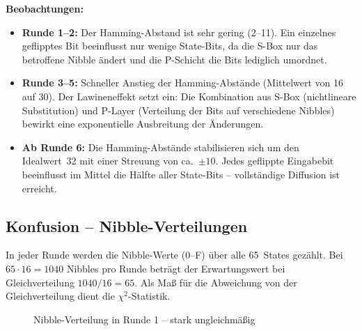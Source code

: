\documentclass[
    fontsize=12pt,          %
    paper=a4,               %
    numbers=noenddot,       %
    listof=totoc,           %
    listof=entryprefix,     %
    listof=nochaptergap,    %
    bibliography=totoc,     %
    parskip=half,           %
    openany                 %
]{scrbook}
\begin{document}
\textbf{Beobachtungen:}
\begin{itemize}
    \item \textbf{Runde 1--2:} Der Hamming-Abstand ist sehr gering (2--11).
    Ein einzelnes geflipptes Bit beeinflusst nur wenige State-Bits, da die S-Box nur das betroffene Nibble ändert und die P-Schicht die Bits lediglich umordnet.
    \item \textbf{Runde 3--5:} Schneller Anstieg der Hamming-Abstände (Mittelwert von 16 auf 30).
    Der Lawineneffekt setzt ein: Die Kombination aus S-Box (nichtlineare Substitution) und P-Layer (Verteilung der Bits auf verschiedene Nibbles) bewirkt eine exponentielle Ausbreitung der Änderungen.
    \item \textbf{Ab Runde 6:} Die Hamming-Abstände stabilisieren sich um den Idealwert~32 mit einer Streuung von ca.\ $\pm10$.
    Jedes geflippte Eingabebit beeinflusst im Mittel die Hälfte aller State-Bits -- vollständige Diffusion ist erreicht.
\end{itemize}


\subsection*{Konfusion -- Nibble-Verteilungen}

In jeder Runde werden die Nibble-Werte (0--F) über alle 65~States gezählt.
Bei $65 \cdot 16 = 1040$ Nibbles pro Runde beträgt der Erwartungswert bei Gleichverteilung $1040 / 16 = 65$.
Als Maß für die Abweichung von der Gleichverteilung dient die $\chi^2$-Statistik.

\begin{figure}[H]
    \centering
    \caption{Nibble-Verteilung in Runde 1 -- stark ungleichmäßig}
    \label{fig:nibble1}
\end{figure}
\end{document}
